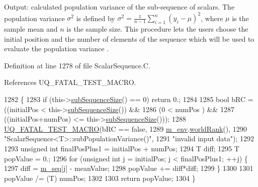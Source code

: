 Output\-: calculated population variance of the sub-\/sequence of scalars. The population variance $ \sigma^2 $ is defined by $ \sigma^2 = \frac{1}{n-1} \sum_{i=1}^n \left(y_i - \mu \right)^2 $, where $ \mu $ is the sample mean and $ n $ is the sample size. This procedure lets the users choose the initial position and the number of elements of the sequence which will be used to evaluate the population variance . 

Definition at line 1278 of file Scalar\-Sequence.\-C.



References U\-Q\-\_\-\-F\-A\-T\-A\-L\-\_\-\-T\-E\-S\-T\-\_\-\-M\-A\-C\-R\-O.


\begin{DoxyCode}
1282 \{
1283   \textcolor{keywordflow}{if} (this->\hyperlink{class_q_u_e_s_o_1_1_scalar_sequence_a0288ea295eedc216a1617b3286f6f3a0}{subSequenceSize}() == 0) \textcolor{keywordflow}{return} 0.;
1284 
1285   \textcolor{keywordtype}{bool} bRC = ((initialPos          <  this->\hyperlink{class_q_u_e_s_o_1_1_scalar_sequence_a0288ea295eedc216a1617b3286f6f3a0}{subSequenceSize}()) &&
1286               (0                   <  numPos                 ) &&
1287               ((initialPos+numPos) <= this->\hyperlink{class_q_u_e_s_o_1_1_scalar_sequence_a0288ea295eedc216a1617b3286f6f3a0}{subSequenceSize}()));
1288   \hyperlink{_defines_8h_a56d63d18d0a6d45757de47fcc06f574d}{UQ\_FATAL\_TEST\_MACRO}(bRC == \textcolor{keyword}{false},
1289                       \hyperlink{class_q_u_e_s_o_1_1_scalar_sequence_a71618cd6351b29361b437af68447a4c8}{m\_env}.\hyperlink{class_q_u_e_s_o_1_1_base_environment_a78b57112bbd0e6dd0e8afec00b40ffa7}{worldRank}(),
1290                       \textcolor{stringliteral}{"ScalarSequence<T>::subPopulationVariance()"},
1291                       \textcolor{stringliteral}{"invalid input data"});
1292 
1293   \textcolor{keywordtype}{unsigned} \textcolor{keywordtype}{int} finalPosPlus1 = initialPos + numPos;
1294   T diff;
1295   T popValue = 0.;
1296   \textcolor{keywordflow}{for} (\textcolor{keywordtype}{unsigned} \textcolor{keywordtype}{int} j = initialPos; j < finalPosPlus1; ++j) \{
1297     diff = \hyperlink{class_q_u_e_s_o_1_1_scalar_sequence_ae616036fd2e62fb69df167814545e893}{m\_seq}[j] - meanValue;
1298     popValue += diff*diff;
1299   \}
1300 
1301   popValue /= (T) numPos;
1302 
1303   \textcolor{keywordflow}{return} popValue;
1304 \}
\end{DoxyCode}
